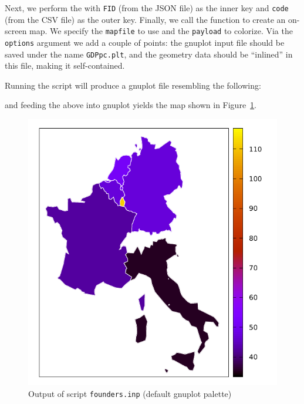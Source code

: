 \documentclass{article}
\begin{document}
Next, we perform the  with \texttt{FID} (from the JSON file)
as the inner key and \texttt{code} (from the CSV file) as the outer
key. Finally, we call the  function to create an
on-screen map. We specify the \texttt{mapfile} to use and the
\texttt{payload} to colorize. Via the \texttt{options} argument we add
a couple of points: the \textsf{gnuplot} input file should be saved
under the name \texttt{GDPpc.plt}, and the geometry data should be
``inlined'' in this file, making it self-contained.

Running the script will produce a \textsf{gnuplot} file resembling the
following:


and feeding the above into \textsf{gnuplot} yields the map shown in
Figure~\ref{fig:founders}.

\begin{figure}[htbp]
  \begin{center}
  \includegraphics[scale=0.9]{GDPpc.pdf}
\end{center}
\caption{Output of script \texttt{founders.inp} (default gnuplot palette)}
\label{fig:founders}
\end{figure}
\end{document}
